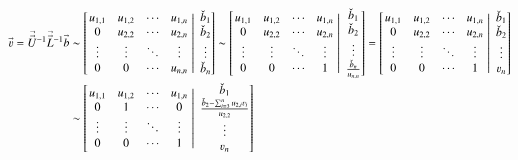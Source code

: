 \documentclass[11pt,english,a4paper]{article}
\begin{document}
\begin{flushleft}
\begin{align*}
\vec{\varv} = \vec{\vec{U}}^{-1}\vec{\vec{L}}^{-1} \vec{b} &\sim \kl{\left.\begin{matrix}  u_{1,1} & u_{1,2} & \cdots & u_{1,n} \\ 0 & u_{2,2} & \cdots & u_{2,n} \\ \vdots & \vdots & \ddots & \vdots \\ 0 & 0 & \cdots & u_{n,n}  \end{matrix}\,\,\right\vert\,\,\begin{matrix} \check b_1 \\ \check b_2 \\ \vdots \\ \check b_n\end{matrix}} 
\sim \kl{\left.\begin{matrix}  u_{1,1} & u_{1,2} & \cdots & u_{1,n} \\ 0 & u_{2,2} & \cdots & u_{2,n} \\ \vdots & \vdots & \ddots & \vdots \\ 0 & 0 & \cdots & 1  \end{matrix}\,\,\right\vert\,\,\begin{matrix} \check b_1 \\ \check b_2 \\ \vdots \\ \frac{\check b_n}{u_{n,n}}\end{matrix}} 
= \kl{\left.\begin{matrix}  u_{1,1} & u_{1,2} & \cdots & u_{1,n} \\ 0 & u_{2,2} & \cdots & u_{2,n} \\ \vdots & \vdots & \ddots & \vdots \\ 0 & 0 & \cdots & 1  \end{matrix}\,\,\right\vert\,\,\begin{matrix} \check b_1 \\ \check b_2 \\ \vdots \\ \varv_n \end{matrix}} 
\\
&\sim\kl{\left.\begin{matrix}  u_{1,1} & u_{1,2} & \cdots & u_{1,n} \\ 0 & 1 & \cdots & 0 \\ \vdots & \vdots & \ddots & \vdots \\ 0 & 0 & \cdots & 1  \end{matrix}\,\,\right\vert\,\,\begin{matrix} \check b_1 \\ \frac{\check b_2-\sum_{i=3}^n u_{2,i}\varv_i}{u_{2,2}} \\ \vdots \\ \varv_n \end{matrix}}

\end{align*}
\end{flushleft}
\end{document}
